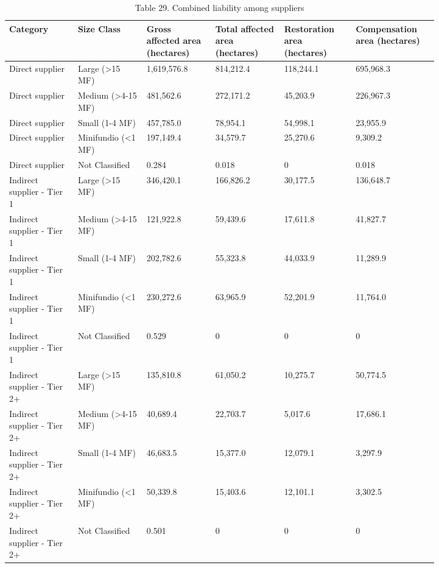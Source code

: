 \documentclass[12pt]{article}
\begin{document}
\begin{table}[H]
\centering
\caption{Table 29. Combined liability among suppliers}
{\fontsize{12}{14}\selectfont
\setlength{\tabcolsep}{3pt}
\renewcommand{\arraystretch}{1.08}
\begin{tabular}{p{0.137\linewidth}p{0.137\linewidth}p{0.137\linewidth}p{0.137\linewidth}p{0.137\linewidth}p{0.137\linewidth}}
\toprule
Category & Size Class & Gross affected area (hectares) & Total affected area (hectares) & Restoration area (hectares) & Compensation area (hectares) \\
\midrule
Direct supplier & Large (>15 MF) & 1,619,576.8 & 814,212.4 & 118,244.1 & 695,968.3 \\
Direct supplier & Medium (>4-15 MF) & 481,562.6 & 272,171.2 & 45,203.9 & 226,967.3 \\
Direct supplier & Small (1-4 MF) & 457,785.0 & 78,954.1 & 54,998.1 & 23,955.9 \\
Direct supplier & Minifundio (<1 MF) & 197,149.4 & 34,579.7 & 25,270.6 & 9,309.2 \\
Direct supplier & Not Classified & 0.284 & 0.018 & 0 & 0.018 \\
Indirect supplier - Tier 1 & Large (>15 MF) & 346,420.1 & 166,826.2 & 30,177.5 & 136,648.7 \\
Indirect supplier - Tier 1 & Medium (>4-15 MF) & 121,922.8 & 59,439.6 & 17,611.8 & 41,827.7 \\
Indirect supplier - Tier 1 & Small (1-4 MF) & 202,782.6 & 55,323.8 & 44,033.9 & 11,289.9 \\
Indirect supplier - Tier 1 & Minifundio (<1 MF) & 230,272.6 & 63,965.9 & 52,201.9 & 11,764.0 \\
Indirect supplier - Tier 1 & Not Classified & 0.529 & 0 & 0 & 0 \\
Indirect supplier - Tier 2+ & Large (>15 MF) & 135,810.8 & 61,050.2 & 10,275.7 & 50,774.5 \\
Indirect supplier - Tier 2+ & Medium (>4-15 MF) & 40,689.4 & 22,703.7 & 5,017.6 & 17,686.1 \\
Indirect supplier - Tier 2+ & Small (1-4 MF) & 46,683.5 & 15,377.0 & 12,079.1 & 3,297.9 \\
Indirect supplier - Tier 2+ & Minifundio (<1 MF) & 50,339.8 & 15,403.6 & 12,101.1 & 3,302.5 \\
Indirect supplier - Tier 2+ & Not Classified & 0.501 & 0 & 0 & 0 \\
\bottomrule
\end{tabular}
}
\end{table}
\end{document}
